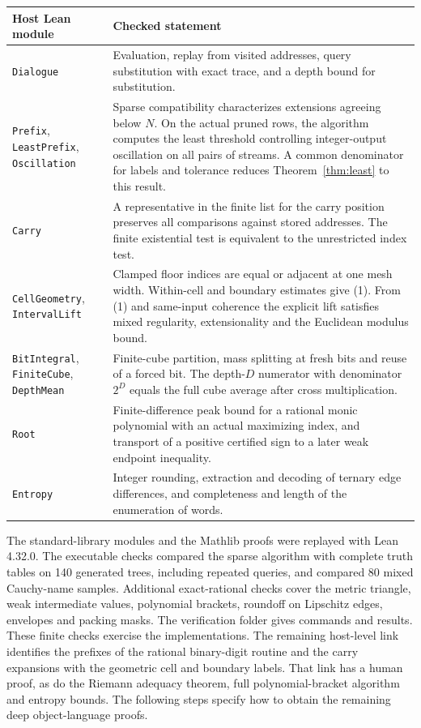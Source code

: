 \begin{center}\small
\begin{tabularx}{\linewidth}{@{}>{\raggedright\arraybackslash}p{.32\linewidth}X@{}}
\toprule Host Lean module & Checked statement\\ \midrule
\texttt{Dialogue} & Evaluation, replay from visited addresses, query substitution with exact trace, and a depth bound for substitution.\\
\texttt{Prefix}, \texttt{LeastPrefix}, \texttt{Oscillation} & Sparse compatibility characterizes extensions agreeing below $N$. On the actual pruned rows, the algorithm computes the least threshold controlling integer-output oscillation on all pairs of streams. A common denominator for labels and tolerance reduces Theorem~\ref{thm:least} to this result.\\
\texttt{Carry} & A representative in the finite list for the carry position preserves all comparisons against stored addresses. The finite existential test is equivalent to the unrestricted index test.\\
\texttt{CellGeometry}, \texttt{IntervalLift} & Clamped floor indices are equal or adjacent at one mesh width. Within-cell and boundary estimates give (1). From (1) and same-input coherence the explicit lift satisfies mixed regularity, extensionality and the Euclidean modulus bound.\\
\texttt{BitIntegral}, \texttt{FiniteCube}, \texttt{DepthMean} & Finite-cube partition, mass splitting at fresh bits and reuse of a forced bit. The depth-$D$ numerator with denominator $2^D$ equals the full cube average after cross multiplication.\\
\texttt{Root} & Finite-difference peak bound for a rational monic polynomial with an actual maximizing index, and transport of a positive certified sign to a later weak endpoint inequality.\\
\texttt{Entropy} & Integer rounding, extraction and decoding of ternary edge differences, and completeness and length of the enumeration of words.\\
\bottomrule
\end{tabularx}
\end{center}
The standard-library modules and the Mathlib proofs were replayed with Lean 4.32.0. The executable checks compared the sparse algorithm with complete truth tables on 140 generated trees, including repeated queries, and compared 80 mixed Cauchy-name samples. Additional exact-rational checks cover the metric triangle, weak intermediate values, polynomial brackets, roundoff on Lipschitz edges, envelopes and packing masks. The verification folder gives commands and results. These finite checks exercise the implementations. The remaining host-level link identifies the prefixes of the rational binary-digit routine and the carry expansions with the geometric cell and boundary labels. That link has a human proof, as do the Riemann adequacy theorem, full polynomial-bracket algorithm and entropy bounds. The following steps specify how to obtain the remaining deep object-language proofs.

